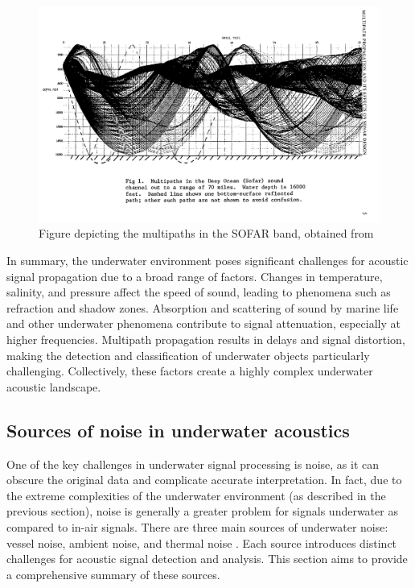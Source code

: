 \begin{figure}[htbp]
    \centering
    \includegraphics[trim={0 20cm 3cm 0},clip,width=\textwidth]{img/ch2/multipath.png}
    \caption{Figure depicting the multipaths in the SOFAR band, obtained from \cite[Fig. 1]{tacconi_multipath_1977}}
    \label{fig:multipath}
\end{figure}

In summary, the underwater environment poses significant challenges for acoustic signal propagation due to a broad range of factors. Changes in temperature, salinity, and pressure affect the speed of sound, leading to phenomena such as refraction and shadow zones. Absorption and scattering of sound by marine life and other underwater phenomena contribute to signal attenuation, especially at higher frequencies. Multipath propagation results in delays and signal distortion, making the detection and classification of underwater objects particularly challenging. Collectively, these factors create a highly complex underwater acoustic landscape.

\subsection{Sources of noise in underwater acoustics}\label{subsec:noise}

One of the key challenges in underwater signal processing is noise, as it can obscure the original data and complicate accurate interpretation. In fact, due to the extreme complexities of the underwater environment (as described in the previous section), noise is generally a greater problem for signals underwater as compared to in-air signals. There are three main sources of underwater noise: vessel noise, ambient noise, and thermal noise \cite{waite_sonar_2002}. Each source introduces distinct challenges for acoustic signal detection and analysis. This section aims to provide a comprehensive summary of these sources.

